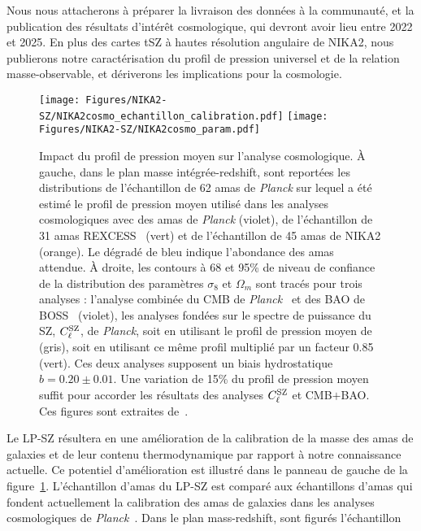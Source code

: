 Nous nous attacherons à préparer la livraison des données à la
communauté, et la publication des résultats d'intérêt cosmologique,
qui devront avoir lieu entre 2022 et 2025. En plus des cartes tSZ à hautes
résolution angulaire de NIKA2, nous publierons notre caractérisation
du profil de pression universel et de la relation masse-observable,
et dériverons les implications pour la cosmologie. 
%
\begin{figure}
  \centering
  \texttt{[image: Figures/NIKA2-SZ/NIKA2cosmo\_echantillon\_calibration.pdf]}
  \texttt{[image: Figures/NIKA2-SZ/NIKA2cosmo\_param.pdf]}
  \caption{Impact du profil de pression moyen sur l'analyse cosmologique. \`A gauche, dans le plan masse intégrée-redshift, sont reportées les distributions de l'échantillon de 62 amas de \emph{Planck} sur lequel a été estimé le profil de pression moyen utilisé dans les analyses cosmologiques avec des amas de \emph{Planck} (violet), de l'échantillon de 31 amas REXCESS~\citep{Pratt2009} (vert) et de l'échantillon de 45 amas de NIKA2 (orange). Le dégradé de bleu indique l'abondance des amas attendue. \`A droite, les contours à 68 et 95\% de niveau de confiance de la distribution des paramètres $\sigma_8$ et $\Omega_m$ sont tracés pour trois analyses : l'analyse combinée du CMB de \emph{Planck}~\citep{Planck_2018_cosmo} et des BAO de BOSS~\citep{Anderson2014} (violet), les analyses fondées sur le spectre de puissance du SZ, $C_\ell^{\rm{SZ}}$, de \emph{Planck}, soit en utilisant le profil de pression moyen de \citet{Planck2016_ymap} (gris), soit en utilisant ce même profil multiplié par un facteur 0.85 (vert). Ces deux analyses supposent un biais hydrostatique $b = 0.20 \pm 0.01$. Une variation de 15\% du profil de pression moyen suffit pour accorder les résultats des analyses $C_\ell^{\rm{SZ}}$ et CMB$+$BAO. Ces figures sont extraites de~\citet{Ruppin2019b}.}
  \label{fig:nika2cosmo}
\end{figure}
%
Le LP-SZ résultera en une amélioration de la calibration de la masse des
amas de galaxies et de leur contenu thermodynamique par rapport à
notre connaissance actuelle. Ce potentiel d'amélioration est illustré
dans le panneau de gauche de la
figure~\ref{fig:nika2cosmo}. L'échantillon d'amas du LP-SZ est comparé
aux échantillons d'amas qui fondent actuellement la calibration des
amas de galaxies dans les analyses cosmologiques de
\emph{Planck}~\citep{Planck_2014_SZ_Cosmo,
  Planck_2014_ymap, Planck_2016_SZ_cosmo, Planck2016_ymap,
  Salvati2018}. Dans le plan mass-redshift, sont figurés l'échantillon
